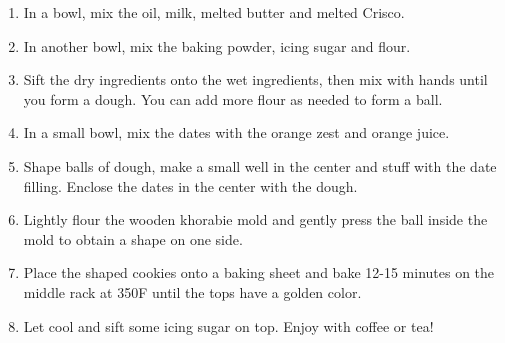 \begin{enumerate}
    \item In a bowl, mix the oil, milk, melted butter and melted Crisco.
    \item In another bowl, mix the baking powder, icing sugar and flour.
    \item Sift the dry ingredients onto the wet ingredients, then mix with hands until you form a dough. You can add more flour as needed to form a ball.
    \item In a small bowl, mix the dates with the orange zest and orange juice.
    \item Shape balls of dough, make a small well in the center and stuff with the date filling. Enclose the dates in the center with the dough. 
    \item Lightly flour the wooden khorabie mold and gently press the ball inside the mold to obtain a shape on one side.
    \item Place the shaped cookies onto a baking sheet and bake 12-15 minutes on the middle rack at 350\degree F until the tops have a golden color. 
    \item Let cool and sift some icing sugar on top. Enjoy with coffee or tea!
\end{enumerate}
